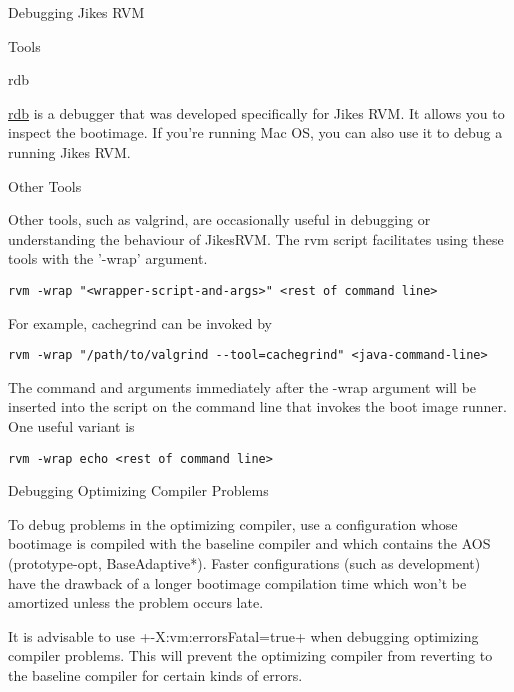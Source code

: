 \begin{section}{Debugging Jikes RVM}
\begin{subsection}{Tools}
\begin{subsubsection}{rdb}

\href{http://sape.inf.usi.ch/rdb}{rdb} is a debugger that was developed specifically for Jikes RVM. It allows you to inspect the bootimage. If you're running Mac OS, you can also use it to debug a running Jikes RVM.
\end{subsubsection}

\begin{subsubsection}{Other Tools}

Other tools, such as valgrind, are occasionally useful in debugging or understanding the behaviour of JikesRVM.  The rvm script facilitates using these tools with the '-wrap' argument.

\begin{lstlisting}
rvm -wrap "<wrapper-script-and-args>" <rest of command line>
\end{lstlisting}

For example, cachegrind can be invoked by

\begin{lstlisting}
rvm -wrap "/path/to/valgrind --tool=cachegrind" <java-command-line>
\end{lstlisting}

The command and arguments immediately after the -wrap argument will be inserted into the script on the command line that invokes the boot image runner.  One useful variant is

\begin{lstlisting}
rvm -wrap echo <rest of command line>
\end{lstlisting}

\end{subsubsection}

\end{subsection}

\begin{subsection}{Debugging Optimizing Compiler Problems}

To debug problems in the optimizing compiler, use a configuration whose bootimage is compiled with the baseline compiler and which contains the AOS (prototype-opt, BaseAdaptive*). Faster configurations (such as development) have the drawback of a longer bootimage compilation time which won't be amortized unless the problem occurs late.

It is advisable to use \spverb+-X:vm:errorsFatal=true+ when debugging optimizing compiler problems. This will prevent the optimizing compiler from reverting to the baseline compiler for certain kinds of errors.


\end{subsection}
\end{section}
